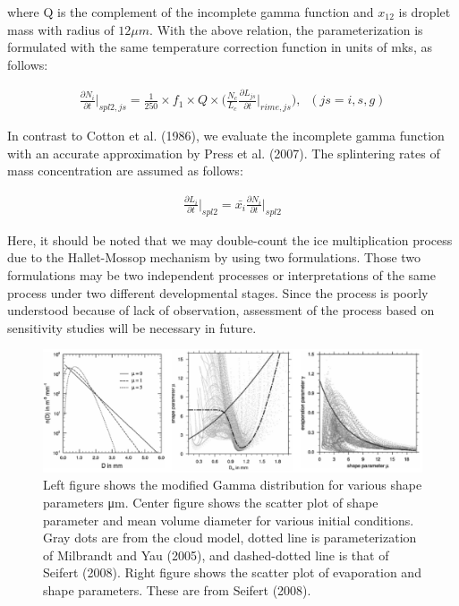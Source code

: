where Q is the complement of the incomplete gamma function and $x_{12}$ is droplet mass with radius of $12 \mu m$. With the above relation, the parameterization is formulated with the same temperature correction function in units of mks, as follows:

\begin{eqnarray}
\frac{\partial N_{i}}{\partial t}\Bigr|_{spl2,js}=\frac{1}{250}\times f_{1}\times Q\times\bigl(\frac{N_{c}}{L_{c}}\frac{\partial L_{js}}{\partial t}\Bigr|_{rime,js}\bigr),\;\;(js=i,s,g)\label{sn216}
\end{eqnarray}

In contrast to Cotton et al. (1986), we evaluate the incomplete gamma function with an accurate approximation by Press et al. (2007). The splintering rates of mass concentration are assumed as follows:

\begin{eqnarray}
\frac{\partial L_{i}}{\partial t}\Bigr|_{spl2} = \bar{x_{i}}\frac{\partial N_{i}}{\partial t}\Bigr|_{spl2}\label{sn217}
\end{eqnarray}

Here, it should be noted that we may double-count the ice multiplication process due to the Hallet-Mossop mechanism by using two formulations. Those two formulations may be two independent processes or interpretations of the same process under two different developmental stages. Since the process is poorly understood because of lack of observation, assessment of the process based on sensitivity studies will be necessary in future.

\begin{figure}[htpb]
\begin{center}
\includegraphics[scale=0.75]{./figure/mod_gamma_dist.eps}
\end{center}
\caption{Left figure shows the modified Gamma distribution for various shape parameters μm. Center figure shows the scatter plot of shape parameter and mean volume diameter for various initial conditions. Gray dots are from the cloud model, dotted line is parameterization of Milbrandt and Yau (2005), and dashed-dotted line is that of Seifert (2008). Right figure shows the scatter plot of evaporation and shape parameters. These are from Seifert (2008).}
\label{figsn2-17}
\end{figure}

